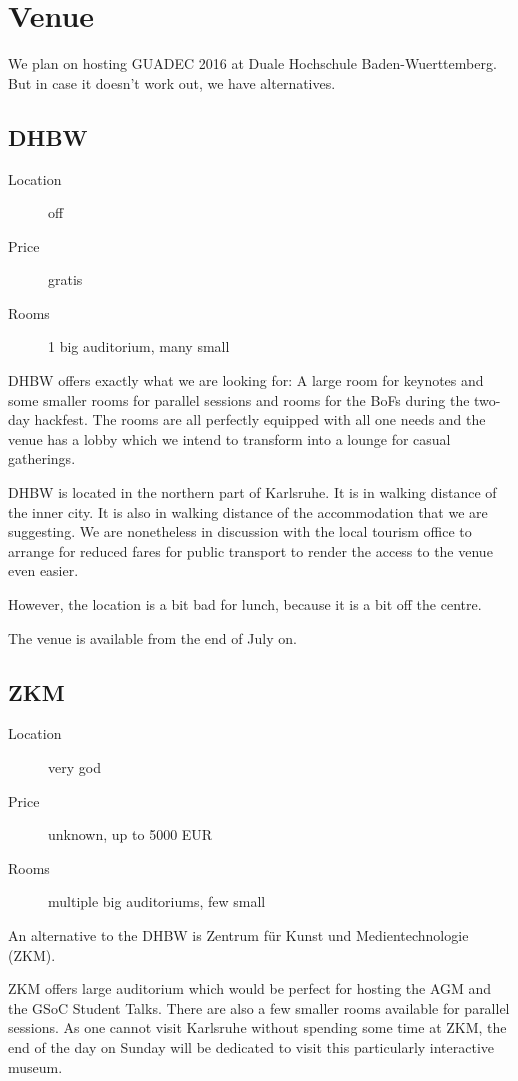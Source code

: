 
\section{Venue}

We plan on hosting GUADEC 2016 at Duale Hochschule Baden-Wuerttemberg.
But in case it doesn't work out, we have alternatives.

\subsection{DHBW}
\begin{description}
\item[Location] off
\item[Price] gratis
\item[Rooms] 1 big auditorium, many small
\end{description}

DHBW offers exactly what we are looking for: A large room for keynotes 
and some smaller rooms for parallel sessions and rooms for the BoFs 
during the two-day hackfest. The rooms are all perfectly equipped with 
all one needs and the venue has a lobby which we intend to transform 
into a lounge for casual gatherings.

DHBW is located in the northern part of Karlsruhe. It is in walking 
distance of the inner city. It is also in walking distance of the 
accommodation that we are suggesting. We are nonetheless in discussion 
with the local tourism office to arrange for reduced fares for public 
transport to render the access to the venue even easier.

However, the location is a bit bad for lunch, because it is a bit off the centre.

The venue is available from the end of July on.


\subsection{ZKM}
\begin{description}
\item[Location] very god
\item[Price] unknown, up to 5000 EUR
\item[Rooms] multiple big auditoriums, few small
\end{description}

An alternative to the DHBW is Zentrum für Kunst und Medientechnologie (ZKM).

ZKM offers large auditorium which would be perfect for hosting the AGM
and the GSoC Student Talks. There are also a few smaller rooms 
available for parallel sessions. As one cannot visit Karlsruhe without 
spending some time at ZKM, the end of the day on Sunday will be 
dedicated to visit this particularly interactive museum.


